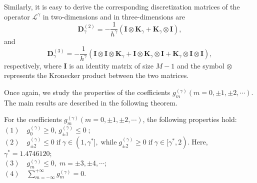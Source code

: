 \documentclass{siamart171218}
\numberwithin{theorem}{section}
\numberwithin{equation}{section}
\begin{document}
Similarly, it is easy to derive
the corresponding
discretization matrices of the operator $\mathcal{L}^\gamma$ in two-dimensions
and in three-dimensions
are
$$\mathbf{D}_\gamma^{(2)}=-\frac{1}{h^\gamma}\left(\mathbf{I}\otimes\mathbf{K}_\gamma
+\mathbf{K}_\gamma\otimes \mathbf{I}\right),$$
and$$
\mathbf{D}_\gamma^{(3)}=-\frac{1}{h^\gamma}\left(\mathbf{I}\otimes \mathbf{I}
\otimes\mathbf{K}_\gamma
+\mathbf{I}\otimes\mathbf{K}_\gamma\otimes \mathbf{I}
+\mathbf{K}_\gamma\otimes \mathbf{I}\otimes \mathbf{I}\right),$$
respectively, where $\mathbf{I}$ is an identity
 matrix of size $M-1$ and the symbol $\otimes$ represents
the Kronecker product between the two matrices.

Once again, we study the properties of the coefficients
$g_{m}^{(\gamma)}(m=0,\pm1,\pm2,\cdots)$. The main results are
 described in the following theorem.

\begin{lemma}\label{Lem.2.2} For the coefficients
$g_{m}^{(\gamma)}(m=0,\pm1,\pm2,\cdots)$, the following properties hold:\vspace{0.2cm}\\
$\mathrm{(1)}$~~$\displaystyle g_{0}^{(\gamma)}\geq0$,\;
$ g_{\pm1}^{(\gamma)}\leq0\;$;\vspace{0.2 cm}\\
$\mathrm{(2)}$~~$g_{\pm2}^{(\gamma)}\leq0\; \mathrm{if}\;\gamma\in(1,\gamma^{*}],
\;\mathrm{while} \;g_{\pm2}^{(\gamma)}\geq0\; \mathrm{if}\;\gamma\in[\gamma^{*},2).
\;\mathrm{Here}$,\;
$\gamma^{*}=1.4746120;$\vspace{0.2 cm}\\
$\mathrm{(3)}$~~$ g_{m}^{(\gamma)}\leq0,\;m=\pm3,\pm4,\cdots$;\vspace{0.2 cm}\\
$\mathrm{(4)}$~~$\displaystyle\sum\limits_{m=-\infty}^{+\infty}g_{m}^{(\gamma)}=0.$
\end{lemma}
\end{document}
